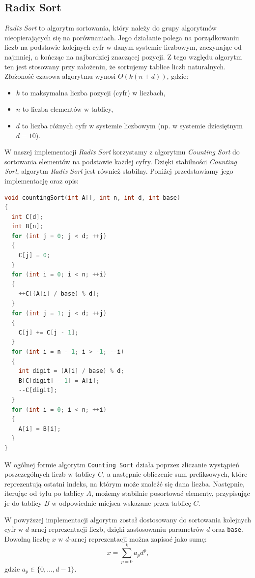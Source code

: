 \documentclass{article}
\begin{document}
\subsection{Radix Sort}
\textit{Radix Sort} to algorytm sortowania, który należy do grupy algorytmów nieopierających się na porównaniach. Jego działanie polega na porządkowaniu liczb na podstawie kolejnych cyfr w danym systemie liczbowym, zaczynając od najmniej, a kończąc na najbardziej znaczącej pozycji. Z tego względu algorytm ten jest stosowany przy założeniu, że sortujemy tablice liczb naturalnych. Złożoność czasowa algorytmu wynosi $\Theta(k(n + d))$, gdzie:
\begin{itemize}
    \item $k$ to maksymalna liczba pozycji (cyfr) w liczbach,
    \item $n$ to liczba elementów w tablicy,
    \item $d$ to liczba różnych cyfr w systemie liczbowym (np. w systemie dziesiętnym $d = 10$).
\end{itemize}
W naszej implementacji \textit{Radix Sort} korzystamy z algorytmu \textit{Counting Sort} do sortowania elementów na podstawie każdej cyfry. Dzięki stabilności \textit{Counting Sort}, algorytm \textit{Radix Sort} jest również stabilny. Poniżej przedstawiamy jego implementację oraz opis:
\newpage
\begin{lstlisting}[style=mystyle, language=C++, caption={Implementacja \texttt{Counting Sort}}, label={lst:countingsort}]
void countingSort(int A[], int n, int d, int base)
{
  int C[d];
  int B[n];
  for (int j = 0; j < d; ++j)
  {
    C[j] = 0;
  }
  for (int i = 0; i < n; ++i)
  {
    ++C[(A[i] / base) % d];
  }
  for (int j = 1; j < d; ++j)
  {
    C[j] += C[j - 1];
  }
  for (int i = n - 1; i > -1; --i)
  {
    int digit = (A[i] / base) % d;
    B[C[digit] - 1] = A[i];
    --C[digit];
  }
  for (int i = 0; i < n; ++i)
  {
    A[i] = B[i];
  }
}
\end{lstlisting}
W ogólnej formie algorytm \texttt{Counting Sort} działa poprzez zliczanie wystąpień poszczególnych liczb w tablicy $C$, a następnie obliczenie sum prefiksowych, które reprezentują ostatni indeks, na którym może znaleźć się dana liczba. Następnie, iterując od tyłu po tablicy $A$, możemy stabilnie posortować elementy, przypisując je do tablicy $B$ w odpowiednie miejsca wskazane przez tablicę $C$. 

W powyższej implementacji algorytm został dostosowany do sortowania kolejnych cyfr w $d$-arnej reprezentacji liczb, dzięki zastosowaniu parametrów $d$ oraz \texttt{base}. Dowolną liczbę $x$ w $d$-arnej reprezentacji można zapisać jako sumę:
\[
    x = \sum_{p=0}^{k} a_p d^p,
\]
gdzie $a_p \in \{0, \ldots, d-1\}$. 
\end{document}
